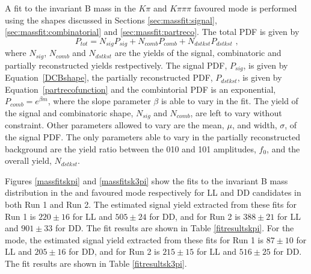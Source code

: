 A fit to the invariant B mass in the $K\pi$ and $K\pi\pi\pi$ favoured mode is performed using the shapes discussed in Sections \ref{sec:massfit:signal}, \ref{sec:massfit:combinatorial} and \ref{sec:massfit:partreco}. The total PDF is given by
\begin{equation}
P_{tot} = N_{sig}P_{sig} + N_{comb}P_{comb} + N_{dstkst}P_{dstkst} \text{ ,}
\end{equation}
where $N_{sig}$, $N_{comb}$ and $N_{dstkst}$ are the yields of the signal, combinatoric and partially reconstructed yields restpectively. The signal PDF, $P_{sig}$, is given by Equation~\ref{DCBshape}, the partially reconstructed PDF, $P_{dstkst}$, is given by Equation~\ref{partrecofunction} and the combintorial PDF is an exponential, $P_{comb} = e^{\beta m}$, where the slope parameter $\beta$ is able to vary in the fit. The yield of the signal and combinatoric shape, $N_{sig}$ and $N_{comb}$, are left to vary without constraint. Other parameters allowed to vary are the mean, $\mu$, and width, $\sigma$, of the signal PDF. The only parameters able to vary in the partially reconstructed background are the yield ratio between the 010 and 101 amplitudes, $f_0$, and the overall yield, $N_{dstkst}$.

Figures \ref{massfitskpi} and \ref{massfitsk3pi} show the fits to the invariant B mass distribution in the \kpi and \kpipipi favoured mode respectively for LL and DD candidates in both Run 1 and Run 2. The estimated \kpi signal yield extracted from these fits for Run 1 is $220 \pm 16$ for LL and $505 \pm 24$ for DD, and for Run 2 is $388 \pm 21$ for LL and $901 \pm 33$ for DD. The fit results are shown in Table \ref{fitresultskpi}. For the \kpipipi mode, the estimated signal yield extracted from these fits for Run 1 is $87 \pm 10$ for LL and $205 \pm 16$ for DD, and for Run 2 is $215 \pm 15$ for LL and $516 \pm 25$ for DD. The fit results are shown in Table \ref{fitresultsk3pi}.

